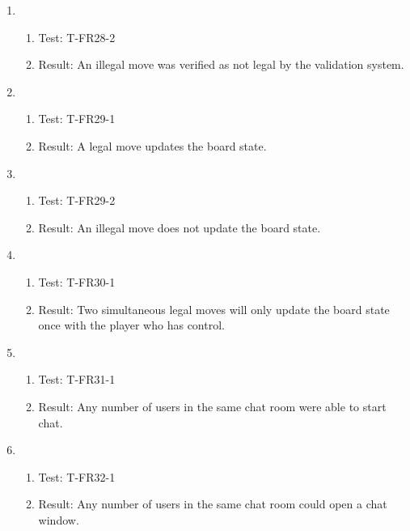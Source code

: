 \documentclass[12pt, titlepage]{article}
\begin{document}
\begin{enumerate}[\indent {}]
        \item 
            \begin{enumerate}[ ]
                \item Test: T-FR28-2
                \item Result: An illegal move was verified as not legal by the validation system.
            \end{enumerate}
        
            
        \item 
            \begin{enumerate}[ ]
                \item Test: T-FR29-1
                \item Result: A legal move updates the board state.
            \end{enumerate}
            
        \item 
            \begin{enumerate}[ ]
                \item Test: T-FR29-2
                \item Result: An illegal move does not update the board state.
            \end{enumerate}
            
        \item 
            \begin{enumerate}[ ]
                \item Test: T-FR30-1
                \item Result: Two simultaneous legal moves will only update the board state once with the player who has control.
            \end{enumerate}
            
        \item 
            \begin{enumerate}[ ]
                \item Test: T-FR31-1
                \item Result: Any number of users in the same chat room were able to start chat.
            \end{enumerate}
            
        \item 
            \begin{enumerate}[ ]
                \item Test: T-FR32-1
                \item Result: Any number of users in the same chat room could open a chat window.
            \end{enumerate}
            

\end{enumerate}
\end{document}

